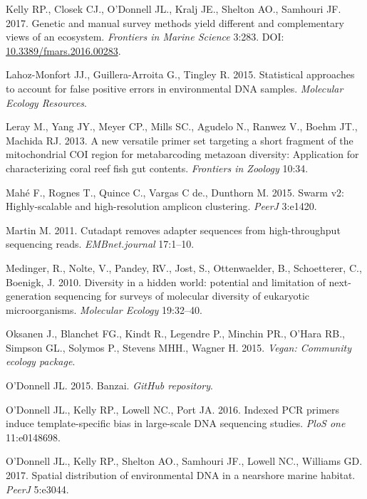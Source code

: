 \documentclass[fleqn,10pt,lineno]{wlpeerj} %
\begin{document}
\hypertarget{ref-kelly2017multilocus}{}
Kelly RP., Closek CJ., O'Donnell JL., Kralj JE., Shelton AO., Samhouri
JF. 2017. Genetic and manual survey methods yield different and
complementary views of an ecosystem. \emph{Frontiers in Marine Science}
3:283. DOI:
\href{https://doi.org/10.3389/fmars.2016.00283}{10.3389/fmars.2016.00283}.

\hypertarget{ref-lahoz2015statistical}{}
Lahoz-Monfort JJ., Guillera-Arroita G., Tingley R. 2015. Statistical
approaches to account for false positive errors in environmental DNA
samples. \emph{Molecular Ecology Resources}.

\hypertarget{ref-leray_new_2013}{}
Leray M., Yang JY., Meyer CP., Mills SC., Agudelo N., Ranwez V., Boehm
JT., Machida RJ. 2013. A new versatile primer set targeting a short
fragment of the mitochondrial COI region for metabarcoding metazoan
diversity: Application for characterizing coral reef fish gut contents.
\emph{Frontiers in Zoology} 10:34.

\hypertarget{ref-mahe2015swarm}{}
Mahé F., Rognes T., Quince C., Vargas C de., Dunthorn M. 2015. Swarm v2:
Highly-scalable and high-resolution amplicon clustering. \emph{PeerJ}
3:e1420.

\hypertarget{ref-martin2011cutadapt}{}
Martin M. 2011. Cutadapt removes adapter sequences from high-throughput
sequencing reads. \emph{EMBnet.journal} 17:1--10.

\hypertarget{ref-medinger2010diversity}{}
Medinger, R., Nolte, V., Pandey, RV., Jost, S., Ottenwaelder, B., Schoetterer, C., Boenigk, J. 2010. Diversity in a hidden world: potential and limitation of next-generation sequencing for surveys of molecular diversity of eukaryotic microorganisms. \emph{Molecular Ecology} 19:32--40.

\hypertarget{ref-vegan}{}
Oksanen J., Blanchet FG., Kindt R., Legendre P., Minchin PR., O'Hara
RB., Simpson GL., Solymos P., Stevens MHH., Wagner H. 2015. \emph{Vegan:
Community ecology package}.

\hypertarget{ref-banzai}{}
O'Donnell JL. 2015. Banzai. \emph{GitHub repository}.

\hypertarget{ref-o2016indexed}{}
O'Donnell JL., Kelly RP., Lowell NC., Port JA. 2016. Indexed PCR primers
induce template-specific bias in large-scale DNA sequencing studies.
\emph{PloS one} 11:e0148698.

\hypertarget{ref-o2017spatial}{}
O'Donnell JL., Kelly RP., Shelton AO., Samhouri JF., Lowell NC.,
Williams GD. 2017. Spatial distribution of environmental DNA in a
nearshore marine habitat. \emph{PeerJ} 5:e3044.
\end{document}
